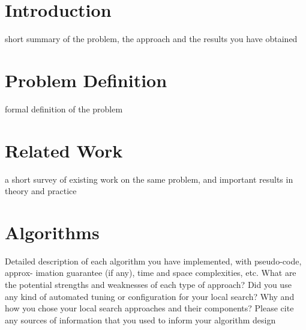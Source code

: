 \documentclass[acmlarge]{acmart}
\begin{document}



\maketitle

\section{Introduction}

short summary of the problem, the approach and the results you have obtained

\lipsum[2-4]


\section{Problem Definition}

formal definition of the problem

\lipsum[2-4]


\section{Related Work}

a short survey of existing work on the same problem, and important results in theory
and practice

\lipsum[2-4]

\section{Algorithms}

Detailed description of each algorithm you have implemented, with pseudo-code, approx-
imation guarantee (if any), time and space complexities, etc. What are the potential strengths and
weaknesses of each type of approach? Did you use any kind of automated tuning or configuration for
your local search? Why and how you chose your local search approaches and their components? Please
cite any sources of information that you used to inform your algorithm design
\end{document}
